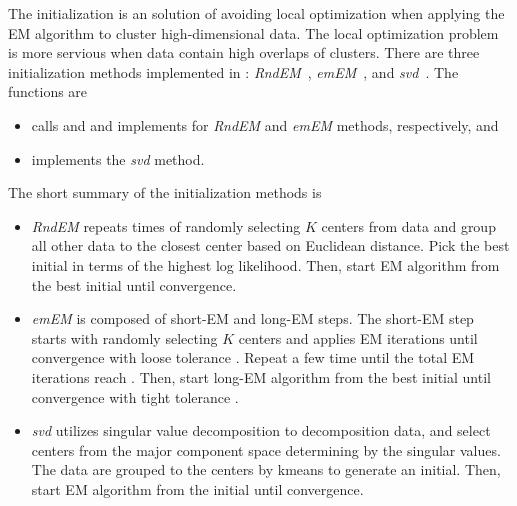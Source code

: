 The initialization is an solution of avoiding local optimization
when applying the EM algorithm to cluster high-dimensional data.
The local optimization problem is more servious when data contain high
overlaps of clusters. There are three initialization methods
implemented in :
{\it RndEM}~\citep{maitra09},
{\it emEM}~\citep{biernackietal03}, and
{\it svd}~\citep{maitra01}.
The  functions are
\begin{itemize}
\item
   calls  and
   and implements for {\it RndEM} and {\it emEM} methods,
  respectively, and
\item
   implements the {\it svd} method.
\end{itemize}
The short summary of the initialization methods is
\begin{itemize}
\item {\it RndEM} repeats  times of randomly selecting
$K$ centers from data and group all other data to the closest center
based on Euclidean distance. Pick the best initial
in terms of the highest log likelihood. Then, start EM algorithm from
the best initial until convergence.

\item {\it emEM} is composed of short-EM and long-EM steps.
The short-EM step starts with randomly selecting $K$ centers and applies
EM iterations until convergence with loose tolerance .
Repeat a few time until the total
EM iterations reach . Then, start long-EM algorithm from
the best initial until convergence with tight tolerance .

\item {\it svd} utilizes singular value decomposition to decomposition
data, and select centers from the major component space determining by
the singular values. The data are grouped to the centers by kmeans
to generate an initial. Then, start EM algorithm from the initial
until convergence.

\end{itemize}

